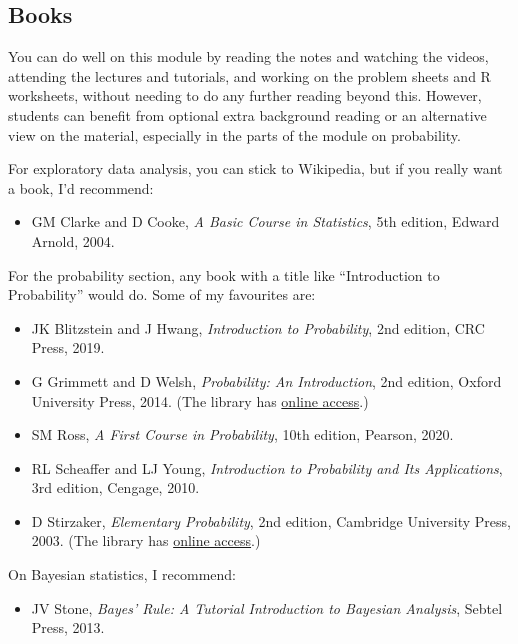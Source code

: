 \documentclass[
  a4paper,
]{book}
\providecommand{\tightlist}{%
  \setlength{\itemsep}{0pt}\setlength{\parskip}{0pt}}
\theoremstyle{definition}
\theoremstyle{definition}
\theoremstyle{definition}
\theoremstyle{definition}
\theoremstyle{remark}
\begin{document}
\hypertarget{books}{%
\subsection*{Books}\label{books}}

You can do well on this module by reading the notes and watching the videos, attending the lectures and tutorials, and working on the problem sheets and R worksheets, without needing to do any further reading beyond this. However, students can benefit from optional extra background reading or an alternative view on the material, especially in the parts of the module on probability.

For exploratory data analysis, you can stick to Wikipedia, but if you really want a book, I'd recommend:

\begin{itemize}
\tightlist
\item
  GM Clarke and D Cooke, \emph{A Basic Course in Statistics}, 5th edition, Edward Arnold, 2004.
\end{itemize}

For the probability section, any book with a title like ``Introduction to Probability'' would do. Some of my favourites are:

\begin{itemize}
\tightlist
\item
  JK Blitzstein and J Hwang, \emph{Introduction to Probability}, 2nd edition, CRC Press, 2019.
\item
  G Grimmett and D Welsh, \emph{Probability: An Introduction}, 2nd edition, Oxford University Press, 2014. (The library has \href{https://leeds.primo.exlibrisgroup.com/permalink/44LEE_INST/13rlbcs/alma991002938669705181}{online access}.)
\item
  SM Ross, \emph{A First Course in Probability}, 10th edition, Pearson, 2020.
\item
  RL Scheaffer and LJ Young, \emph{Introduction to Probability and Its Applications}, 3rd edition, Cengage, 2010.
\item
  D Stirzaker, \emph{Elementary Probability}, 2nd edition, Cambridge University Press, 2003. (The library has \href{https://leeds.primo.exlibrisgroup.com/permalink/44LEE_INST/13rlbcs/alma991013131349705181}{online access}.)
\end{itemize}

On Bayesian statistics, I recommend:

\begin{itemize}
\tightlist
\item
  JV Stone, \emph{Bayes' Rule: A Tutorial Introduction to Bayesian Analysis}, Sebtel Press, 2013.
\end{itemize}
\end{document}
